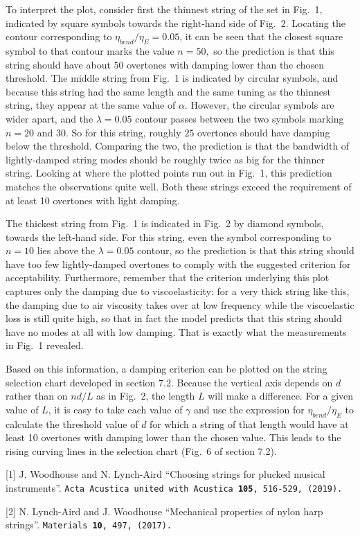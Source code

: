   To interpret the plot, consider first the thinnest string of the set in Fig.\ 
  1, indicated by square symbols towards the right-hand side of Fig.\ 2. 
  Locating the contour corresponding to $\eta_{bend}/\eta_E=0.05$, it can be 
  seen that the closest square symbol to that contour marks the value $n=50,$ 
  so the prediction is that this string should have about $50$ overtones with 
  damping lower than the chosen threshold. The middle string from Fig.\ 1 is 
  indicated by circular symbols, and because this string had the same length 
  and the same tuning as the thinnest string, they appear at the same value of 
  $\alpha$. However, the circular symbols are wider apart, and the 
  $\lambda=0.05$ contour passes between the two symbols marking $n= 20$ and 
  $30$. So for this string, roughly $25$ overtones should have damping below 
  the threshold. Comparing the two, the prediction is that the bandwidth of 
  lightly-damped string modes should be roughly twice as big for the thinner 
  string. Looking at where the plotted points run out in Fig.\ 1, this 
  prediction matches the observations quite well. Both these strings exceed the 
  requirement of at least 10 overtones with light damping. 

  The thickest string from Fig.\ 1 is indicated in Fig.\ 2 by diamond symbols, 
  towards the left-hand side. For this string, even the symbol corresponding to 
  $n=10$ lies above the $\lambda=0.05$ contour, so the prediction is that this 
  string should have too few lightly-damped overtones to comply with the 
  suggested criterion for acceptability. Furthermore, remember that the 
  criterion underlying this plot captures only the damping due to 
  viscoelasticity: for a very thick string like this, the damping due to air 
  viscosity takes over at low frequency while the viscoelastic loss is still 
  quite high, so that in fact the model predicts that this string should have 
  no modes at all with low damping. That is exactly what the measurements in 
  Fig.\ 1 revealed. 

  Based on this information, a damping criterion can be plotted on the string 
  selection chart developed in section 7.2. Because the vertical axis depends 
  on $d$ rather than on $nd/L$ as in Fig.\ 2, the length $L$ will make a 
  difference. For a given value of $L$, it is easy to take each value of 
  $\gamma$ and use the expression for $\eta_{bend}/\eta_E$ to calculate the 
  threshold value of $d$ for which a string of that length would have at least 
  10 overtones with damping lower than the chosen value. This leads to the 
  rising curving lines in the selection chart (Fig.\ 6 of section 7.2). 

  \sectionreferences{}[1] J. Woodhouse and N. Lynch-Aird ``Choosing strings for 
  plucked musical instruments''. \tt{}Acta Acustica united with Acustica 
  \textbf{105}, 516-529, (2019)\rm{}.~ 

  [2] N. Lynch-Aird and J. Woodhouse ``Mechanical properties of nylon harp 
  strings''. \tt{}Materials \textbf{10}, 497, (2017)\rm{}.~ 